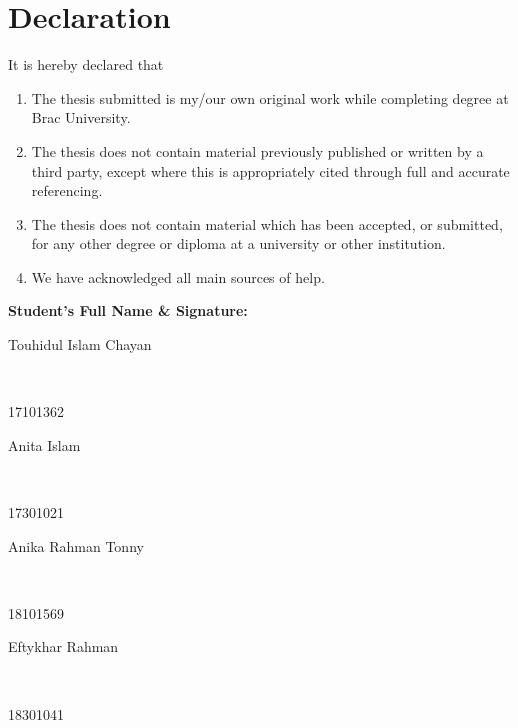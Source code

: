 \newcommand*\wildcard[2][6cm]{\vspace{2cm}\parbox{#1}{\hrulefill\par#2}} 


\section*{Declaration}

It is hereby declared that

\begin{enumerate} %
  \item The thesis submitted is my/our own original work while completing degree at Brac University.
  \item The thesis does not contain material previously published or written by a third party, except where this is appropriately cited through full and accurate referencing.
  \item The thesis does not contain material which has been accepted, or submitted, for any other degree or diploma at a university or other institution.
  \item We have acknowledged all main sources of help.
\end{enumerate}

\vspace{1cm}
\textbf{Student’s Full Name \& Signature:} %

\begingroup
    \begin{center}
        \wildcard{\centerline{Touhidul Islam Chayan} \\ \centerline{17101362}} %
        \hspace{2cm} %
        \wildcard{\centerline{Anita Islam} \\ \centerline{17301021} }
        \wildcard{\centerline{Anika Rahman Tonny} \\ \centerline{18101569} }
        \hspace{2cm}
        \wildcard{\centerline{Eftykhar Rahman \\} \\ \centerline{18301041} }
    \end{center}

\endgroup


\pagebreak





